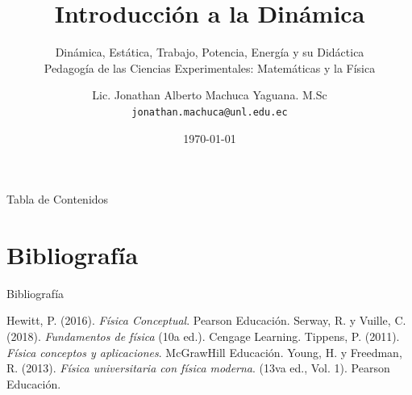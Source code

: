 \documentclass[10pt]{beamer}
\begin{document}
\title{Introducción a la Dinámica}
\subtitle{Dinámica, Estática, Trabajo, Potencia, Energía y su Didáctica\\
{\scriptsize Pedagogía de las Ciencias Experimentales: Matemáticas y la Física}}

\author[M.Sc. Jonathan Machuca]{
Lic. Jonathan Alberto Machuca Yaguana. M.Sc\\
{\scriptsize \texttt{jonathan.machuca@unl.edu.ec}}}


\date{\today}


\begin{frame}[plain]
    \maketitle
\end{frame}


\begin{frame}{Tabla de Contenidos}
    \tableofcontents
\end{frame}





\section{Bibliografía}

\begin{frame}{Bibliografía}
    \begin{thebibliography}{8}
         Hewitt, P. (2016). \textit{Física Conceptual}. Pearson Educación.
         Serway, R. y Vuille, C. (2018). \textit{Fundamentos de física} (10a ed.). Cengage Learning.
         Tippens, P. (2011). \textit{Física conceptos y aplicaciones}. McGrawHill Educación.
          Young, H. y Freedman, R. (2013). \textit{Física universitaria con física moderna}. (13va ed., Vol. 1). Pearson Educación.
    \end{thebibliography}
\end{frame}
\end{document}
